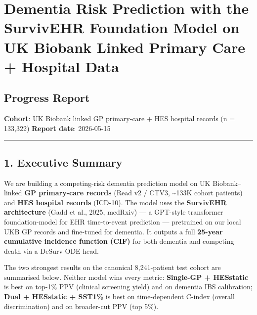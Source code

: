 \documentclass[
  11pt,
]{article}
\author{}
\date{}
\begin{document}
\section{Dementia Risk Prediction with the SurvivEHR Foundation Model on
UK Biobank Linked Primary Care + Hospital
Data}\label{dementia-risk-prediction-with-the-survivehr-foundation-model-on-uk-biobank-linked-primary-care-hospital-data}

\subsection{Progress Report}\label{progress-report}

\textbf{Cohort}: UK Biobank linked GP primary-care + HES hospital
records (n = 133,322) \textbf{Report date}: 2026-05-15

\begin{center}\rule{0.5\linewidth}{0.5pt}\end{center}

\subsection{1. Executive Summary}\label{executive-summary}

We are building a competing-risk dementia prediction model on UK
Biobank--linked \textbf{GP primary-care records} (Read v2 / CTV3,
\textasciitilde133K cohort patients) and \textbf{HES hospital records}
(ICD-10). The model uses the \textbf{SurvivEHR architecture} (Gadd et
al., 2025, medRxiv) --- a GPT-style transformer foundation-model for EHR
time-to-event prediction --- pretrained on our local UKB GP records and
fine-tuned for dementia. It outputs a full \textbf{25-year cumulative
incidence function (CIF)} for both dementia and competing death via a
DeSurv ODE head.

The two strongest results on the canonical 8,241-patient test cohort are
summarised below. Neither model wins every metric: \textbf{Single-GP +
HESstatic} is best on top-1\% PPV (clinical screening yield) and on
dementia IBS calibration; \textbf{Dual + HESstatic + SST1\%} is best on
time-dependent C-index (overall discrimination) and on broader-cut PPV
(top 5\%).
\end{document}
